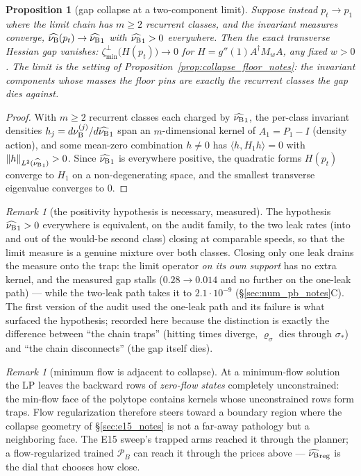 \documentclass[11pt]{article}
\newtheorem{proposition}[theorem]{Proposition}
\theoremstyle{definition}
\theoremstyle{remark}
\newtheorem{remark}[theorem]{Remark}
\def\lambda{\widehat\nuB}
\begin{document}
\begin{proposition}[gap collapse at a two-component limit]\label{prop:gap_collapse_notes}
Suppose instead $p_t\to p_1$ where the limit chain has $m\geq2$ recurrent classes, and
the invariant measures converge, $\lambda(p_t)\to\lambda_1$ with $\lambda_1>0$
everywhere. Then the exact transverse Hessian gap vanishes:
$\zeta^{\perp}_{\min}\bigl(H(p_t)\bigr)\to0$ for
$H = g''(1)A^\dagger M_wA$, any fixed $w>0$. The limit is the setting of
Proposition~\ref{prop:collapse_floor_notes}: the invariant components whose masses the floor
pins are exactly the recurrent classes the gap dies against.
\end{proposition}

\begin{proof}
With $m\geq2$ recurrent classes each charged by $\lambda_1$, the per-class invariant
densities $h_j = d\nuB^{(j)}/d\lambda_1$ span an $m$-dimensional kernel of $A_1 = P_1-I$
(density action), and some mean-zero combination $h\neq0$ has
$\langle h, H_1h\rangle=0$ with $\|h\|_{L^2(\lambda_1)}>0$. Since $\lambda_1$ is
everywhere positive, the quadratic forms $H(p_t)$ converge to $H_1$ on a
non-degenerating space, and the smallest transverse eigenvalue converges to $0$.
\end{proof}

\begin{remark}[the positivity hypothesis is necessary, measured]\label{rem:one_leak_notes}
The hypothesis $\lambda_1>0$ everywhere is equivalent, on the audit family, to the two
leak rates (into and out of the would-be second class) closing at comparable speeds, so
that the limit measure is a genuine mixture over both classes. Closing only one leak
drains the measure onto the trap: the limit operator \emph{on its own support} has no
extra kernel, and the measured gap stalls ($0.28\to0.014$ and no further on the one-leak
path) --- while the two-leak path takes it to $2.1\cdot10^{-9}$
(\S\ref{sec:num_pb_notes}C). The first version of the audit used the one-leak path and its
failure is what surfaced the hypothesis; recorded here because the distinction is
exactly the difference between ``the chain traps'' (hitting times diverge,
$\varrho_\sigma$ dies through $\sigma_*$) and ``the chain disconnects'' (the gap itself
dies).
\end{remark}

\begin{remark}[minimum flow is adjacent to collapse]\label{rem:lp_degeneracy_notes}
At a minimum-flow solution the LP leaves the backward rows of \emph{zero-flow states}
completely unconstrained: the min-flow face of the polytope contains kernels whose
unconstrained rows form traps. Flow regularization therefore steers toward a boundary
region where the collapse geometry of \S\ref{sec:e15_notes} is not a far-away pathology but a
neighboring face. The E15 sweep's trapped arms reached it through the planner; a
flow-regularized trained $\mathcal P_B$ can reach it through the prices above ---
$\lamreg$ is the dial that chooses how close.
\end{remark}
\end{document}
